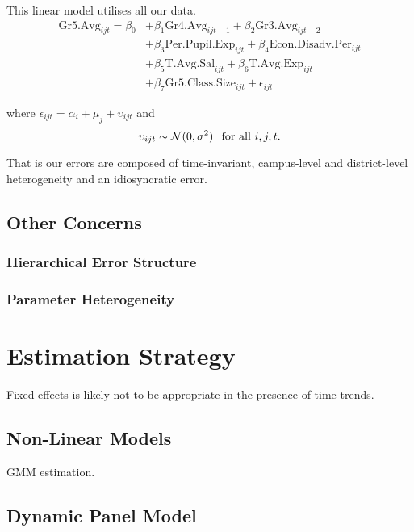 \documentclass[11pt]{article}
\newcommand{\N}{\mathcal{N}}
\begin{document}
This linear model utilises all our data.
\begin{align*}
\mathrm{Gr5.Avg}_{ijt} = \beta_{0} 
    &+ \beta_{1}  \mathrm{Gr4.Avg}_{ijt-1} 
    + \beta_{2}  \mathrm{Gr3.Avg}_{ijt-2}    \\
    &+ \beta_{3}  \mathrm{Per.Pupil.Exp}_{ijt} 
    + \beta_{4}  \mathrm{Econ.Disadv.Per}_{ijt} \\
    &+ \beta_{5}  \mathrm{T.Avg.Sal}_{ijt}   
    + \beta_{6}  \mathrm{T.Avg.Exp}_{ijt}  \\
    &+ \beta_{7}  \mathrm{Gr5.Class.Size}_{ijt} + \epsilon_{ijt}
\end{align*}

where $\epsilon_{ijt}=\alpha_{i}+\mu_{j}+\upsilon_{ijt}$ and
$$\upsilon_{ijt} \sim \N(0,\sigma^2) \hspace{0.1in} \mbox{for all } i,j,t.$$

That is  our errors are composed of time-invariant, campus-level and district-level heterogeneity and an idiosyncratic error. 

\subsection{Other Concerns}

\subsubsection{Hierarchical Error Structure}

\subsubsection{Parameter Heterogeneity}




\section{Estimation Strategy}

Fixed effects is likely not to be appropriate in the presence of time trends. 

\subsection{Non-Linear Models}

GMM estimation.

\subsection{Dynamic Panel Model}
\end{document}
